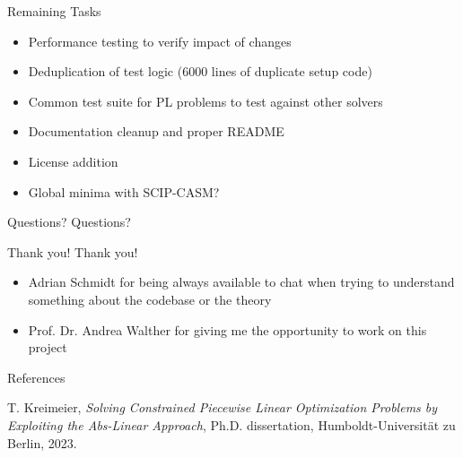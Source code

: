 \documentclass[aspectratio=169]{beamer}
\begin{document}
\begin{frame}{Remaining Tasks}
    \begin{itemize}[<+->]
        \item Performance testing to verify impact of changes
        \item Deduplication of test logic (6000 lines of duplicate setup code)
        \item Common test suite for PL problems to test against other solvers
        \item Documentation cleanup and proper README
        \item License addition
        \item Global minima with SCIP-CASM?
    \end{itemize}

\end{frame}

\begin{frame}{Questions?}
    \centering
    \vspace{2cm}
    \Huge Questions?
    \vspace{2cm}
\end{frame}

\begin{frame}{Thank you!}
    \centering
    \vspace{1cm}
    \Huge Thank you!
    \vspace{0.5cm}

    \large
    \begin{itemize}
        \item Adrian Schmidt for being always available to chat when trying to
              understand something about the codebase or the theory
        \item Prof. Dr. Andrea Walther for giving me the opportunity to work on
              this project
    \end{itemize}
    \vspace{1cm}
\end{frame}

\begin{frame}{References}
    \begin{thebibliography}{1}
        T. Kreimeier, \emph{Solving Constrained Piecewise Linear Optimization
            Problems by Exploiting the Abs-Linear Approach},
        Ph.D. dissertation, Humboldt-Universität zu Berlin, 2023.
    \end{thebibliography}
\end{frame}
\end{document}
